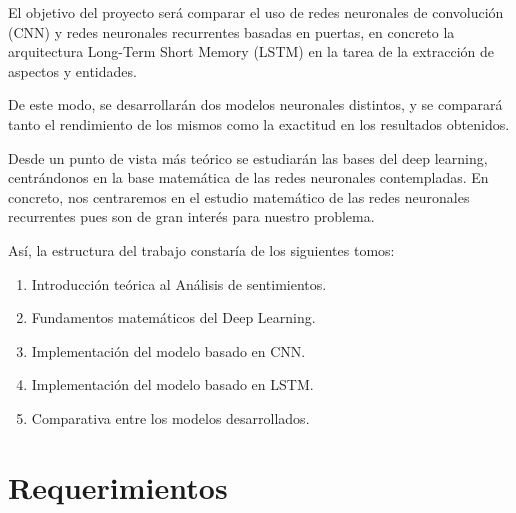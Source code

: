 	El objetivo del proyecto será comparar el uso de redes neuronales de convolución (CNN) y redes neuronales recurrentes basadas en puertas, en concreto la arquitectura Long-Term Short Memory (LSTM) en la tarea de la extracción de aspectos y entidades. 
	
	De este modo, se desarrollarán dos modelos neuronales distintos, y se comparará tanto el rendimiento de los mismos como la exactitud en los resultados obtenidos. 
	
	Desde un punto de vista más teórico se estudiarán las bases del deep learning, centrándonos en la base matemática de las redes neuronales contempladas.  En concreto, nos centraremos en el estudio matemático  de las redes neuronales recurrentes pues son de gran interés para nuestro problema.
	
	Así, la estructura del trabajo constaría de los siguientes tomos:
	
	 \begin{enumerate}
	 	\item Introducción teórica al Análisis de sentimientos.
	 	\item Fundamentos matemáticos del Deep Learning.
	 	\item Implementación del modelo basado en CNN.
	 	\item Implementación del modelo basado en LSTM.
	 	\item Comparativa entre los modelos desarrollados.
	 \end{enumerate}

	 
	\section{Requerimientos}\label{requerimientos}
	
